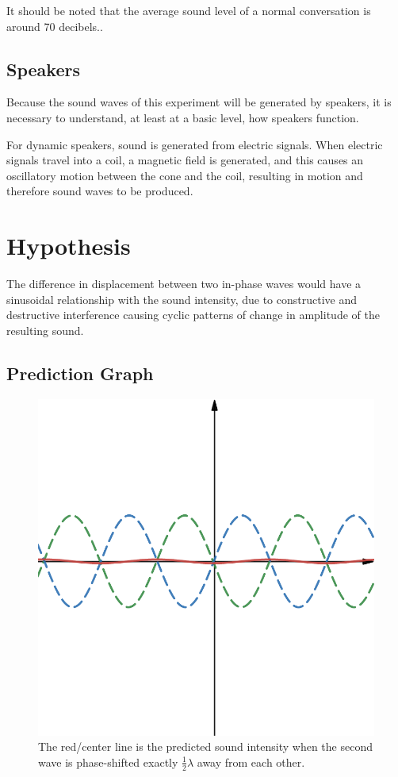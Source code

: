 \documentclass[index]{subfiles}
\begin{document}
It should be noted that the average sound level of a normal conversation is around 70 decibels.\cite{speakers}.

\subsection{Speakers}

Because the sound waves of this experiment will be generated by speakers, it is necessary to understand, at least at a basic level, how speakers function.\cite{speakers}

For dynamic speakers, sound is generated from electric signals. When electric signals travel into a coil, a magnetic field is generated, and this causes an oscillatory motion between the cone and the coil\cites{openstax}{speakers}, resulting in motion and therefore sound waves to be produced.

\section{Hypothesis}

The difference in displacement between two in-phase waves would have a sinusoidal relationship with the sound intensity, due to constructive and destructive interference causing cyclic patterns of change in amplitude of the resulting sound.

\subsection{Prediction Graph}

\begin{figure}[H]
    \centering
    \includegraphics[scale=0.3]{res/prediction.png}
    \caption{The red/center line is the predicted sound intensity when the second wave is phase-shifted exactly \(\frac{1}{2}\lambda \) away from each other.}
\end{figure}
\end{document}
